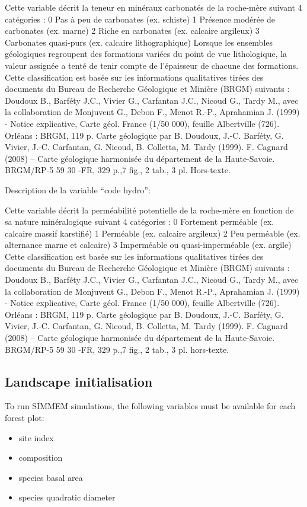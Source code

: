 \documentclass[a4paper]{article}
\begin{document}
Cette variable décrit la teneur en minéraux carbonatés de la roche-mère suivant 4 catégories :
0  Pas à peu de carbonates (ex. schiste)
1  Présence modérée de carbonates (ex. marne)
2  Riche en carbonates (ex. calcaire argileux)
3  Carbonates quasi-purs (ex. calcaire lithographique)
Lorsque les ensembles géologiques regroupent des formations variées du point de vue lithologique, la valeur assignée a tenté de tenir compte de l’épaisseur de chacune des formations.
Cette classification est basée sur les informations qualitatives tirées des documents du Bureau de Recherche Géologique et Minière (BRGM) suivants :
Doudoux B., Barféty J.C., Vivier G., Carfantan J.C., Nicoud G., Tardy M., avec la collaboration de Monjuvent G., Debon F., Menot R.-P., Aprahamian J. (1999) - Notice explicative, Carte géol. France (1/50 000), feuille Albertville (726). Orléans : BRGM, 119 p. Carte géologique par B. Doudoux, J.-C. Barféty, G. Vivier, J.-C. Carfantan, G. Nicoud, B. Colletta, M. Tardy (1999).
F. Cagnard (2008) – Carte géologique harmonisée du département de la Haute-Savoie. BRGM/RP-5 59 30 -FR, 329 p.,7 fig., 2 tab., 3 pl. Hors-texte.

\noindent Description de la variable “code hydro”:

Cette variable décrit la perméabilité potentielle de la roche-mère en fonction de sa nature minéralogique suivant 4 catégories :
0  Fortement perméable (ex. calcaire massif karstifié)
1  Perméable (ex. calcaire argileux)
2  Peu perméable (ex. alternance marne et calcaire)
3  Imperméable ou quasi-imperméable (ex. argile)
Cette classification est basée sur les informations qualitatives tirées des documents du Bureau de Recherche Géologique et Minière (BRGM) suivants :
Doudoux B., Barféty J.C., Vivier G., Carfantan J.C., Nicoud G., Tardy M., avec la collaboration de Monjuvent G., Debon F., Menot R.-P., Aprahamian J. (1999) - Notice explicative, Carte géol. France (1/50 000), feuille Albertville (726). Orléans : BRGM, 119 p. Carte géologique par B. Doudoux, J.-C. Barféty, G. Vivier, J.-C. Carfantan, G. Nicoud, B. Colletta, M. Tardy (1999).
F. Cagnard (2008) – Carte géologique harmonisée du département de la Haute-Savoie. BRGM/RP-5 59 30 -FR, 329 p.,7 fig., 2 tab., 3 pl. hors-texte.


\subsection*{Landscape initialisation}
To run SIMMEM simulations, the following variables must be available for each forest plot:
\begin{itemize}
    \item site index
    \item composition
    \item species basal area
    \item species quadratic diameter
\end{itemize}
\end{document}
